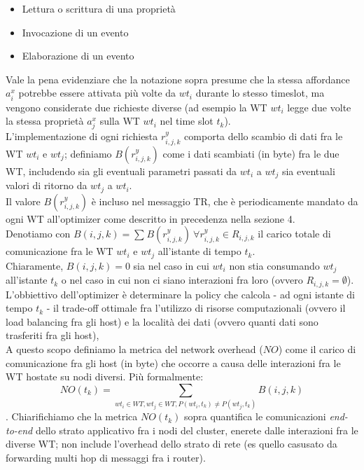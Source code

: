 \documentclass[11pt]{article}
\begin{document}
		\begin{itemize}
			\item Lettura o scrittura di una proprietà
			\item Invocazione di un evento
			\item Elaborazione di un evento
		\end{itemize}
		Vale la pena evidenziare che la notazione sopra presume che la stessa affordance $a_i^x$ potrebbe essere attivata più volte da $wt_i$ durante lo stesso timeslot, ma vengono considerate due richieste diverse (ad esempio la WT $wt_i$ legge due volte la stessa proprietà $a^x_j$ sulla WT $wt_i$ nel time slot $t_k$). \\
		L'implementazione di ogni richiesta $r^y_{i,j,k}$ comporta dello scambio di dati fra le WT $wt_i$ e $wt_j$; definiamo $B(r^y_{i,j,k})$ come i dati scambiati (in byte) fra le due WT, includendo sia gli eventuali parametri passati da $wt_i$ a $wt_j$ sia eventuali valori di ritorno da $wt_j$ a $wt_i$. \\
		Il valore $B(r^y_{i,j,k})$ è incluso nel messaggio TR, che è periodicamente mandato da ogni WT all'optimizer come descritto in precedenza nella sezione 4. \\
		Denotiamo con $B(i, j, k) = \sum_{}^{} B(r^y_{i,j,k}) \  \forall r^y_{i,j,k} \in R_{i,j,k}$ il carico totale di comunicazione fra le WT $wt_i$ e $wt_j$ all'istante di tempo $t_k$. \\
		Chiaramente, $B(i, j, k) = 0$ sia nel caso in cui $wt_i$ non stia consumando $wt_j$ all'istante $t_k$ o nel caso in cui non ci siano interazioni fra loro (ovvero $R_{i,j,k} = \emptyset$). \\
		L'obbiettivo dell'optimizer è determinare la policy che calcola - ad ogni istante di tempo $t_k$ - il trade-off ottimale fra l'utilizzo di risorse computazionali (ovvero il load balancing fra gli host) e la località dei dati (ovvero quanti dati sono trasferiti fra gli host), \\
		A questo scopo definiamo la metrica del network overhead ($NO$) come il carico di comunicazione fra gli host (in byte) che occorre a causa delle interazioni fra le WT hostate su nodi diversi. Più formalmente:
		\[
			NO(t_k) = \sum_{wt_i \in WT, wt_j \in WT, P(wt_i, t_k) \neq P(wt_j, t_k)} B(i,j,k)
		\].
		Chiarifichiamo che la metrica $NO(t_k)$ sopra quantifica le comunicazioni \textit{end-to-end} dello strato applicativo fra i nodi del cluster, enerete dalle interazioni fra le diverse WT; non include l'overhead dello strato di rete (es quello casusato da forwarding multi hop di messaggi fra i router). \\
\end{document}
